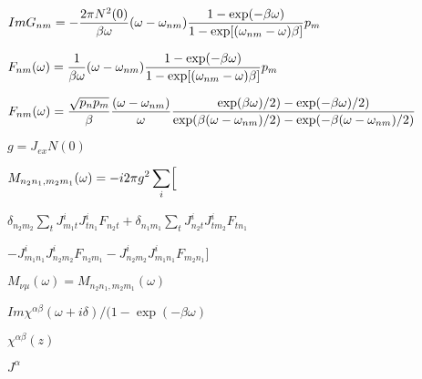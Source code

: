 \documentclass[twoside]{article}
\def\lthtmlcheckvsize{\ifdim\ht\sizebox<\vsize 
  \ifdim\wd\sizebox<\hsize\expandafter\hfill\fi \expandafter\vfill
  \else\expandafter\vss\fi}%
\begin{document}
{\newpage\clearpage
{}%
$\displaystyle Im G_{nm}=-{2\pi N^2(0)\over \beta \omega}(\omega -\omega_{nm}) {1-\exp(-\beta
\omega)\over
1-\exp[(\omega_{nm}-\omega)\beta]}p_m
$%
\lthtmlindisplaymathZ
\lthtmlcheckvsize\clearpage}

{\newpage\clearpage
{}%
$\displaystyle F_{nm}(\omega )= {1\over \beta \omega}(\omega -\omega_{nm}) {1-\exp(-\beta
\omega)\over
1-\exp[(\omega_{nm}-\omega)\beta]}p_m
$%
\lthtmlindisplaymathZ
\lthtmlcheckvsize\clearpage}

{\newpage\clearpage
{}%
$\displaystyle F_{nm}(\omega )= {\sqrt{p_np_m}\over \beta}{(\omega -\omega_{nm})\over
\omega} {\exp(\beta \omega)/2) - \exp(-\beta \omega)/2)\over
\exp(\beta (\omega-\omega_{nm})/2) - \exp(-\beta (\omega -\omega_{nm})/2)}
$%
\lthtmlindisplaymathZ
\lthtmlcheckvsize\clearpage}

{\newpage\clearpage
{}%
$g=J_{ex}N(0)$%
\lthtmlindisplaymathZ
\lthtmlcheckvsize\clearpage}

{\newpage\clearpage
{}%
$\displaystyle M_{n_2n_1,m_2m_1}(\omega) =- i 2\pi g^2
\sum_i\Bigl[$%
\lthtmlindisplaymathZ
\lthtmlcheckvsize\clearpage}

{\newpage\clearpage
{}%
$\textstyle \delta_{n_2m_2}\sum_tJ^i_{m_1t}J^i_{tn_1}F_{n_2t}
+ \delta_{n_1m_1}\sum_tJ^i_{
n_2t}J^i_{tm_2}F_{tn_1}$%
\lthtmlindisplaymathZ
\lthtmlcheckvsize\clearpage}

{\newpage\clearpage
{}%
$\textstyle -J^i_{m_1n_1}J^i_{n_2m_2}F_{n_2m_1}
-J^i_{n_2m_2}J^i_{m_1n_1}F_{m_2n_1}\Bigr]$%
\lthtmlindisplaymathZ
\lthtmlcheckvsize\clearpage}

{\newpage\clearpage
{}%
$\displaystyle M_{\nu \mu}(\omega)= M_{n_2n_1,m_2m_1}(\omega)
$%
\lthtmlindisplaymathZ
\lthtmlcheckvsize\clearpage}

{\newpage\clearpage
{}%
$Im \chi^{\alpha\beta}(\omega+i\delta)/(1-\exp(-\beta\omega)$%
\lthtmlindisplaymathZ
\lthtmlcheckvsize\clearpage}

{\newpage\clearpage
{}%
$\chi^{\alpha\beta}(z)$%
\lthtmlindisplaymathZ
\lthtmlcheckvsize\clearpage}

{\newpage\clearpage
{}%
$J^\alpha$%
\lthtmlindisplaymathZ
\lthtmlcheckvsize\clearpage}
\end{document}
